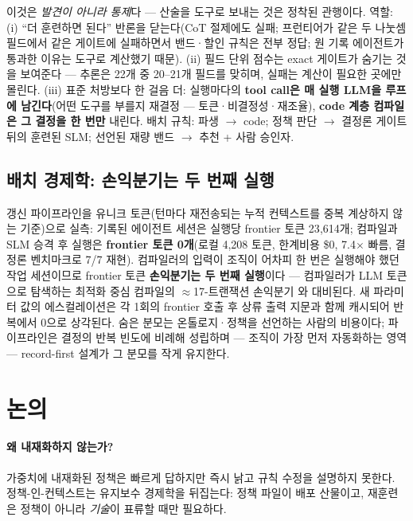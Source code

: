 \documentclass[11pt]{article}
\begin{document}
이것은 \emph{발견이 아니라 통제}다 --- 산술을 도구로 보내는 것은 정착된 관행이다. 역할: (i) ``더 훈련하면 된다'' 반론을 닫는다(CoT 절제에도 실패; 프런티어가 같은 두 나눗셈 필드에서 같은 게이트에 실패하면서 밴드·할인 규칙은 전부 정답; 원 기록 에이전트가 통과한 이유는 도구로 계산했기 때문). (ii) 필드 단위 점수는 exact 게이트가 숨기는 것을 보여준다 --- 추론은 22개 중 20--21개 필드를 맞히며, 실패는 계산이 필요한 곳에만 몰린다. (iii) 표준 처방보다 한 걸음 더: 실행마다의 \textbf{tool call은 매 실행 LLM을 루프에 남긴다}(어떤 도구를 부를지 재결정 --- 토큰·비결정성·재조율), \textbf{code 계층 컴파일은 그 결정을 한 번만} 내린다. 배치 규칙: 파생 $\rightarrow$ code; 정책 판단 $\rightarrow$ 결정론 게이트 뒤의 훈련된 SLM; 선언된 재량 밴드 $\rightarrow$ 추천 + 사람 승인자.

\subsection{배치 경제학: 손익분기는 두 번째 실행}\label{sec:economics}
갱신 파이프라인을 유니크 토큰(턴마다 재전송되는 누적 컨텍스트를 중복 계상하지 않는 기준)으로 실측: 기록된 에이전트 세션은 실행당 frontier 토큰 23{,}614개; 컴파일과 SLM 승격 후 실행은 \textbf{frontier 토큰 0개}(로컬 4{,}208 토큰, 한계비용 \$0, 7.4$\times$ 빠름, 결정론 벤치마크로 7/7 재현). 컴파일러의 입력이 조직이 어차피 한 번은 실행해야 했던 작업 세션이므로 frontier 토큰 \textbf{손익분기는 두 번째 실행}이다 --- 컴파일러가 LLM 토큰으로 탐색하는 최적화 중심 컴파일의 ${\approx}$17-트랜잭션 손익분기 \citep{compiledai2026}와 대비된다. 새 파라미터 값의 에스컬레이션은 각 1회의 frontier 호출 후 상류 출력 지문과 함께 캐시되어 반복에서 0으로 상각된다. 숨은 분모는 온톨로지·정책을 선언하는 사람의 비용이다; 파이프라인은 결정의 반복 빈도에 비례해 성립하며 --- 조직이 가장 먼저 자동화하는 영역 --- record-first 설계가 그 분모를 작게 유지한다.

\section{논의}\label{sec:discussion}

\paragraph{왜 내재화하지 않는가?} 가중치에 내재화된 정책은 빠르게 답하지만 즉시 낡고 규칙 수정을 설명하지 못한다. 정책-인-컨텍스트는 유지보수 경제학을 뒤집는다: 정책 파일이 배포 산물이고, 재훈련은 정책이 아니라 \emph{기술}이 표류할 때만 필요하다.
\end{document}
